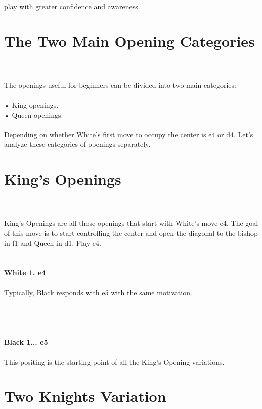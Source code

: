 \documentclass{article}
\begin{document}
play with greater confidence and awareness.\section{ The Two Main Opening Categories}

\\
\\
The openings useful for beginners can be divided into two main categories:\\\\• King openings.\\• Queen openings.\\\\Depending on whether White's first move to occupy the center is e4 or d4. Let's analyze these categories of openings separately.\section{ King's Openings}

\\
\\
King's Openings are all those openings that start with White's move e4. The goal of this move is to start controlling the center and open the diagonal to the bishop in f1 and Queen in d1. Play e4.\\

\\
\\
\textbf{White 1. e4}\\
\\
Typically, Black responds with e5 with the same motivation.\\\\
\\

\\
\\
\textbf{Black 1... e5}\\
\\
This positing is the starting point of all the King's Opening variations.\\\section{ Two Knights Variation}

\end{document}

